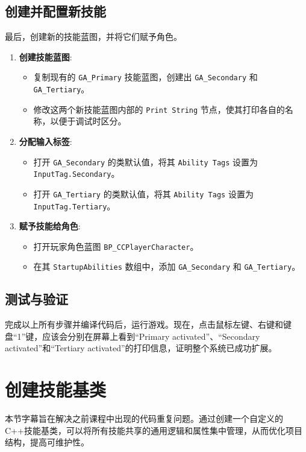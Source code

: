 \documentclass[10pt,CJKmath]{zhbook-v1}
\begin{document}
\subsection{创建并配置新技能}
最后，创建新的技能蓝图，并将它们赋予角色。
\begin{enumerate}
    \item \textbf{创建技能蓝图}:
    \begin{itemize}
        \item 复制现有的 \texttt{GA\_Primary} 技能蓝图，创建出 \texttt{GA\_Secondary} 和 \texttt{GA\_Tertiary}。
        \item 修改这两个新技能蓝图内部的 \texttt{Print String} 节点，使其打印各自的名称，以便于调试时区分。
    \end{itemize}
    \item \textbf{分配输入标签}:
    \begin{itemize}
        \item 打开 \texttt{GA\_Secondary} 的类默认值，将其 \texttt{Ability Tags} 设置为 \texttt{InputTag.Secondary}。
        \item 打开 \texttt{GA\_Tertiary} 的类默认值，将其 \texttt{Ability Tags} 设置为 \texttt{InputTag.Tertiary}。
    \end{itemize}
    \item \textbf{赋予技能给角色}:
    \begin{itemize}
        \item 打开玩家角色蓝图 \texttt{BP\_CCPlayerCharacter}。
        \item 在其 \texttt{StartupAbilities} 数组中，添加 \texttt{GA\_Secondary} 和 \texttt{GA\_Tertiary}。
    \end{itemize}
\end{enumerate}

\subsection{测试与验证}
完成以上所有步骤并编译代码后，运行游戏。现在，点击鼠标左键、右键和键盘“1”键，应该会分别在屏幕上看到“Primary activated”、“Secondary activated”和“Tertiary activated”的打印信息，证明整个系统已成功扩展。



\section{创建技能基类}
本节字幕旨在解决之前课程中出现的代码重复问题。通过创建一个自定义的C++技能基类，可以将所有技能共享的通用逻辑和属性集中管理，从而优化项目结构，提高可维护性。
\end{document}
